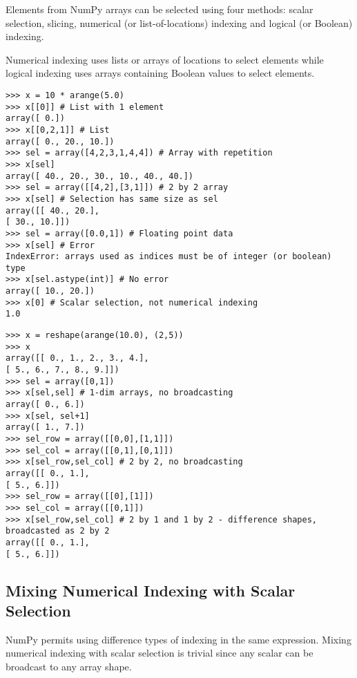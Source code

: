 Elements from NumPy arrays can be selected using four methods: scalar selection, slicing, numerical (or
list-of-locations) indexing and logical (or Boolean) indexing.

Numerical indexing uses lists or arrays of locations
to select elements while logical indexing uses arrays containing Boolean values to select elements.


\begin{verbatim}
>>> x = 10 * arange(5.0)
>>> x[[0]] # List with 1 element
array([ 0.])
>>> x[[0,2,1]] # List
array([ 0., 20., 10.])
>>> sel = array([4,2,3,1,4,4]) # Array with repetition
>>> x[sel]
array([ 40., 20., 30., 10., 40., 40.])
>>> sel = array([[4,2],[3,1]]) # 2 by 2 array
>>> x[sel] # Selection has same size as sel
array([[ 40., 20.],
[ 30., 10.]])
>>> sel = array([0.0,1]) # Floating point data
>>> x[sel] # Error
IndexError: arrays used as indices must be of integer (or boolean) type
>>> x[sel.astype(int)] # No error
array([ 10., 20.])
>>> x[0] # Scalar selection, not numerical indexing
1.0

\end{verbatim}


\begin{verbatim}
>>> x = reshape(arange(10.0), (2,5))
>>> x
array([[ 0., 1., 2., 3., 4.],
[ 5., 6., 7., 8., 9.]])
>>> sel = array([0,1])
>>> x[sel,sel] # 1-dim arrays, no broadcasting
array([ 0., 6.])
>>> x[sel, sel+1]
array([ 1., 7.])
>>> sel_row = array([[0,0],[1,1]])
>>> sel_col = array([[0,1],[0,1]])
>>> x[sel_row,sel_col] # 2 by 2, no broadcasting
array([[ 0., 1.],
[ 5., 6.]])
>>> sel_row = array([[0],[1]])
>>> sel_col = array([[0,1]])
>>> x[sel_row,sel_col] # 2 by 1 and 1 by 2 - difference shapes, broadcasted as 2 by 2
array([[ 0., 1.],
[ 5., 6.]])

\end{verbatim}
\subsection{Mixing Numerical Indexing with Scalar Selection}
NumPy permits using difference types of indexing in the same expression. Mixing numerical indexing
with scalar selection is trivial since any scalar can be broadcast to any array shape.


